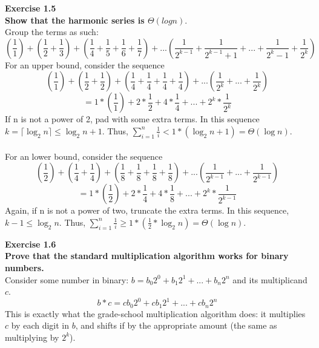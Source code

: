 \documentclass{article}
\newenvironment{problem}[2][Exercise]
    { \begin{mdframed}[backgroundcolor=gray!20] \textbf{#1 #2} \\}
    {  \end{mdframed}}
\begin{document}
\begin{problem}{1.5}
    \textbf{Show that the harmonic series is $\Theta(log n)$}.
    \\
    Group the terms as such:
    \[
        (\frac{1}{1}) + (\frac{1}{2} + \frac{1}{3}) + (\frac{1}{4} + \frac{1}{5} + \frac{1}{6} + \frac{1}{7}) + ... (\frac{1}{2^{k - 1}} + \frac{1}{2^{k - 1} + 1} + ... + \frac{1}{2^k - 1} + \frac{1}{2^k})
    \]
    For an upper bound, consider the sequence
    \[
         (\frac{1}{1}) + (\frac{1}{2} + \frac{1}{2}) + (\frac{1}{4} + \frac{1}{4} + \frac{1}{4} + \frac{1}{4}) + ... (\frac{1}{2^k} + ... + \frac{1}{2^k})
    \]
    \[
         = 1 * (\frac{1}{1}) + 2 * \frac{1}{2} + 4 * \frac{1}{4} + ... + 2^k * \frac{1}{2^k} 
    \]
    If n is not a power of 2, pad with some extra terms. In this sequence $k = \lceil \log_2n \rceil \leq \log_2n + 1$. Thus, $\sum_{i=1}^{n} \frac{1}{i} < 1 * (\log_2n + 1) = \Theta(\log n)$.
    \\ \\
     For an lower bound, consider the sequence
    \[
         (\frac{1}{2}) + (\frac{1}{4} + \frac{1}{4}) + (\frac{1}{8} + \frac{1}{8} + \frac{1}{8} + \frac{1}{8}) + ... (\frac{1}{2^{k - 1}} + ... + \frac{1}{2^{k - 1}})
    \]
    \[
         = 1 * (\frac{1}{2}) + 2 * \frac{1}{4} + 4 * \frac{1}{8} + ... + 2^k * \frac{1}{2^{k - 1}} 
    \]
    Again, if n is not a power of two, truncate the extra terms. In this sequence, $k - 1 \leq \log_2 n$. Thus, $\sum_{i=1}^{n} \frac{1}{i} \geq 1 * (\frac{1}{2} * \log_2n) = \Theta(\log n)$.
\end{problem}

\begin{problem}{1.6}
    \textbf{Prove that the standard multiplication algorithm works for binary numbers.}
    \\
    Consider some number in binary: $b = b_0 2^0 + b_1 2^1 + ... + b_n 2^n$ and its multiplicand $c$. 
    \[
         b * c = c b_0 2^0 + c b_1 2^1 + ... + c b_n 2^n
    \]
    This is exactly what the grade-school multiplication algorithm does: it multiplies $c$ by each digit in $b$, and shifts if by the appropriate amount (the same as multiplying by $2^k$).
\end{problem}
\end{document}
